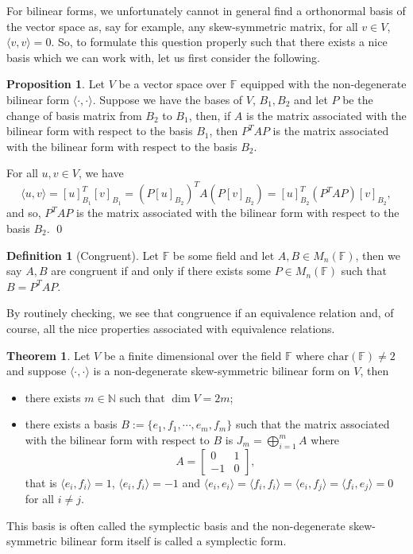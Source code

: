\documentclass[
]{article}
\theoremstyle{definition}
\newtheorem{theorem}{Theorem}
\newtheorem{prop}{Proposition}[section]
\theoremstyle{definition}
\newtheorem{definition}{Definition}[section]
\begin{document}
For bilinear forms, we unfortunately cannot in general find a
orthonormal basis of the vector space as, say for example, any
skew-symmetric matrix, for all \(v \in V\),
\(\langle v, v \rangle = 0\). So, to formulate this question properly
such that there exists a nice basis which we can work with, let us first
consider the following.

\begin{prop}
  Let \(V\) be a vector space over \(\mathbb{F}\) equipped with the non-degenerate 
  bilinear form \(\langle \cdot, \cdot \rangle\). Suppose we have the bases of 
  \(V\), \(B_1, B_2\) and let \(P\) be the change of basis matrix from \(B_2\) 
  to \(B_1\), then, if \(A\) is the matrix associated with the bilinear form with 
  respect to the basis \(B_1\), then \(P^TAP\) is the matrix associated with the 
  bilinear form with respect to the basis \(B_2\).
\end{prop}
\proof

For all \(u, v \in V\), we have
\[\langle u, v \rangle = [u]_{B_1}^T [v]_{B_1} = (P[u]_{B_2})^T A (P[v]_{B_2}) 
  = [u]_{B_2}^T(P^TAP)[v]_{B_2},\] and so, \(P^TAP\) is the matrix
associated with the bilinear form with respect to the basis \(B_2\).
\qed

\begin{definition}[Congruent]
  Let \(\mathbb{F}\) be some field and let \(A, B \in M_n(\mathbb{F})\), then 
  we say \(A, B\) are congruent if and only if there exists some 
  \(P \in M_n(\mathbb{F})\) such that \(B = P^TAP\).
\end{definition}

By routinely checking, we see that congruence if an equivalence relation
and, of course, all the nice properties associated with equivalence
relations.

\begin{theorem}
  Let \(V\) be a finite dimensional over the field \(\mathbb{F}\) where 
  \(\text{char}(\mathbb{F}) \neq 2\) and suppose \(\langle \cdot, \cdot \rangle\) 
  is a non-degenerate skew-symmetric bilinear form on \(V\), then 
  \begin{itemize}
    \item there exists \(m \in \mathbb{N}\) such that \(\dim V = 2m\); 
    \item there exists a basis \(B := \{e_1, f_1, \cdots, e_m, f_m\}\) such that 
      the matrix associated with the bilinear form with respect to \(B\) is 
      \(J_m = \bigoplus_{i = 1}^m A\) where 
      \[A = \begin{bmatrix} 0 & 1 \\ -1 & 0 \end{bmatrix},\]
      that is \(\langle e_i, f_i \rangle = 1\), \(\langle e_i, f_i \rangle = -1\) 
      and \(\langle e_i, e_i \rangle = \langle f_i, f_i \rangle = 
      \langle e_i, f_j \rangle = \langle f_i, e_j \rangle = 0\) for all 
      \(i \neq j\).
  \end{itemize}
  This basis is often called the symplectic basis and the non-degenerate skew-symmetric 
  bilinear form itself is called a symplectic form.
\end{theorem}
\proof
\end{document}
